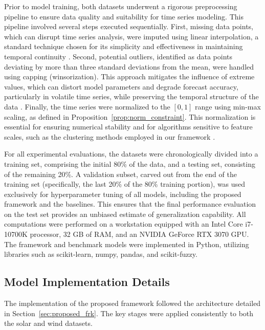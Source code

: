 \documentclass[review,3p,times]{elsarticle}
\begin{document}
Prior to model training, both datasets underwent a rigorous preprocessing pipeline to ensure data quality and suitability for time series modeling. This pipeline involved several steps executed sequentially. First, missing data points, which can disrupt time series analysis, were imputed using linear interpolation, a standard technique chosen for its simplicity and effectiveness in maintaining temporal continuity \cite{daniels1975linear}. Second, potential outliers, identified as data points deviating by more than three standard deviations from the mean, were handled using capping (winsorization). This approach mitigates the influence of extreme values, which can distort model parameters and degrade forecast accuracy, particularly in volatile time series, while preserving the temporal structure of the data \cite{aguinis2013best}. Finally, the time series were normalized to the $[0, 1]$ range using min-max scaling, as defined in Proposition~\ref{prop:norm_constraint}. This normalization is essential for ensuring numerical stability and for algorithms sensitive to feature scales, such as the clustering methods employed in our framework \cite{singh2020investigating}.

For all experimental evaluations, the datasets were chronologically divided into a training set, comprising the initial 80\% of the data, and a testing set, consisting of the remaining 20\%. A validation subset, carved out from the end of the training set (specifically, the last 20\% of the 80\% training portion), was used exclusively for hyperparameter tuning of all models, including the proposed framework and the baselines. This ensures that the final performance evaluation on the test set provides an unbiased estimate of generalization capability. All computations were performed on a workstation equipped with an Intel Core i7-10700K processor, 32 GB of RAM, and an NVIDIA GeForce RTX 3070 GPU. The framework and benchmark models were implemented in Python, utilizing libraries such as scikit-learn, numpy, pandas, and scikit-fuzzy.

\subsection{Model Implementation Details}
\label{subsec:model_implementation}

The implementation of the proposed framework followed the architecture detailed in Section~\ref{sec:proposed_frk}. The key stages were applied consistently to both the solar and wind datasets.
\end{document}
